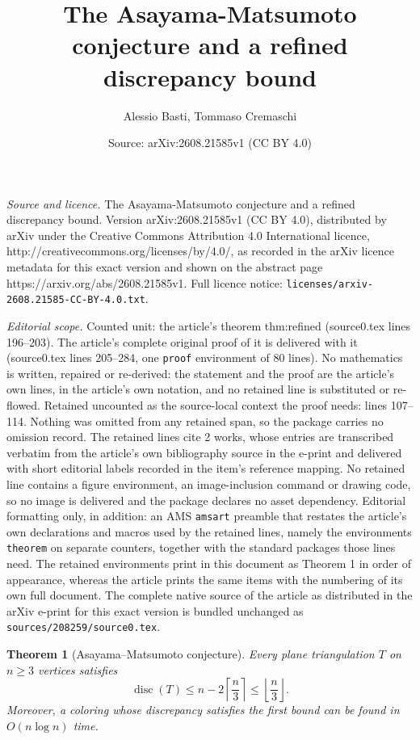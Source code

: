 \documentclass[10pt,a4paper]{amsart}
\title{The Asayama-Matsumoto conjecture and a refined discrepancy bound}
\author{Alessio Basti, Tommaso Cremaschi}
\date{Source: arXiv:2608.21585v1 (CC BY 4.0)}
\newtheorem{theorem}{Theorem}
\newcommand{\ceil}[1]{\left\lceil #1\right\rceil}
\newcommand{\disc}{\operatorname{disc}}
\newcommand{\floor}[1]{\left\lfloor #1\right\rfloor}
\begin{document}
\maketitle

\noindent\emph{Source and licence.} The Asayama-Matsumoto conjecture and a refined discrepancy bound. Version arXiv:2608.21585v1 (CC BY 4.0), distributed by arXiv under the Creative Commons Attribution 4.0 International licence, http://creativecommons.org/licenses/by/4.0/, as recorded in the arXiv licence metadata for this exact version and shown on the abstract page https://arxiv.org/abs/2608.21585v1. Full licence notice: \texttt{licenses/arxiv-2608.21585-CC-BY-4.0.txt}.\par\smallskip

\noindent\textit{Editorial scope.} Counted unit: the article's theorem thm:refined (source0.tex lines 196--203). The article's complete original proof of it is delivered with it (source0.tex lines 205--284, one \texttt{proof} environment of 80 lines). No mathematics is written, repaired or re-derived: the statement and the proof are the article's own lines, in the article's own notation, and no retained line is substituted or re-flowed.  Retained uncounted as the source-local context the proof needs: lines 107--114.  Nothing was omitted from any retained span, so the package carries no omission record.  The retained lines cite 2 works, whose entries are transcribed verbatim from the article's own bibliography source in the e-print and delivered with short editorial labels recorded in the item's reference mapping.  No retained line contains a figure environment, an image-inclusion command or drawing code, so no image is delivered and the package declares no asset dependency.  Editorial formatting only, in addition: an AMS \texttt{amsart} preamble that restates the article's own declarations and macros used by the retained lines, namely the environments \texttt{theorem} on separate counters, together with the standard packages those lines need.  The retained environments print in this document as Theorem 1 in order of appearance, whereas the article prints the same items with the numbering of its own full document.  The complete native source of the article as distributed in the arXiv e-print for this exact version is bundled unchanged as \texttt{sources/208259/source0.tex}.
\begin{theorem}[Asayama--Matsumoto conjecture]\label{thm:universal}
Every plane triangulation $T$ on $n\ge3$ vertices satisfies
\begin{equation}\label{eq:universal}
  \disc(T)\le n-2\ceil{\frac n3}\le\floor{\frac n3}.
\end{equation}
Moreover, a coloring whose discrepancy satisfies the first bound can be found in
$O(n\log n)$ time.
\end{theorem}
\end{document}
